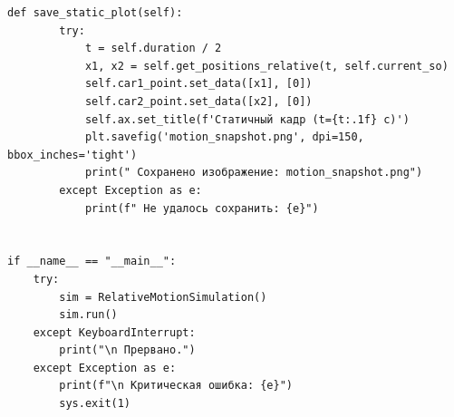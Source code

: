 \documentclass[12pt,a4paper]{article}
\begin{document}
\begin{lstlisting}[caption={Основной код симуляции (main.py)}, label={lst:main}]
    def save_static_plot(self):
        try:
            t = self.duration / 2
            x1, x2 = self.get_positions_relative(t, self.current_so)
            self.car1_point.set_data([x1], [0])
            self.car2_point.set_data([x2], [0])
            self.ax.set_title(f'Статичный кадр (t={t:.1f} с)')
            plt.savefig('motion_snapshot.png', dpi=150, bbox_inches='tight')
            print(" Сохранено изображение: motion_snapshot.png")
        except Exception as e:
            print(f" Не удалось сохранить: {e}")


if __name__ == "__main__":
    try:
        sim = RelativeMotionSimulation()
        sim.run()
    except KeyboardInterrupt:
        print("\n Прервано.")
    except Exception as e:
        print(f"\n Критическая ошибка: {e}")
        sys.exit(1)
\end{lstlisting}
\end{document}
